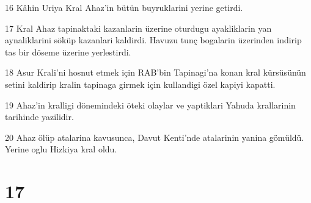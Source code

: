 \par 16 Kâhin Uriya Kral Ahaz'in bütün buyruklarini yerine getirdi.
\par 17 Kral Ahaz tapinaktaki kazanlarin üzerine oturdugu ayakliklarin yan aynaliklarini söküp kazanlari kaldirdi. Havuzu tunç bogalarin üzerinden indirip tas bir döseme üzerine yerlestirdi.
\par 18 Asur Krali'ni hosnut etmek için RAB'bin Tapinagi'na konan kral kürsüsünün setini kaldirip kralin tapinaga girmek için kullandigi özel kapiyi kapatti.
\par 19 Ahaz'in kralligi dönemindeki öteki olaylar ve yaptiklari Yahuda krallarinin tarihinde yazilidir.
\par 20 Ahaz ölüp atalarina kavusunca, Davut Kenti'nde atalarinin yanina gömüldü. Yerine oglu Hizkiya kral oldu.

\chapter{17}

